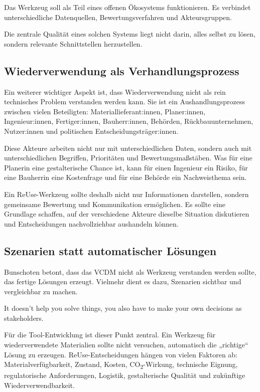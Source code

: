 Das Werkzeug soll als Teil eines offenen Ökosystems funktionieren. Es verbindet unterschiedliche Datenquellen, Bewertungsverfahren und Akteursgruppen.

Die zentrale Qualität eines solchen Systems liegt nicht darin, alles selbst zu lösen, sondern relevante Schnittstellen herzustellen.

\subsection{Wiederverwendung als Verhandlungsprozess}

Ein weiterer wichtiger Aspekt ist, dass Wiederverwendung nicht als rein technisches Problem verstanden werden kann. Sie ist ein Aushandlungsprozess zwischen vielen Beteiligten: Materiallieferant:innen, Planer:innen, Ingenieur:innen, Fertiger:innen, Bauherr:innen, Behörden, Rückbauunternehmen, Nutzer:innen und politischen Entscheidungsträger:innen.

Diese Akteure arbeiten nicht nur mit unterschiedlichen Daten, sondern auch mit unterschiedlichen Begriffen, Prioritäten und Bewertungsmaßstäben. Was für eine Planerin eine gestalterische Chance ist, kann für einen Ingenieur ein Risiko, für eine Bauherrin eine Kostenfrage und für eine Behörde ein Nachweisthema sein.

Ein ReUse-Werkzeug sollte deshalb nicht nur Informationen darstellen, sondern gemeinsame Bewertung und Kommunikation ermöglichen. Es sollte eine Grundlage schaffen, auf der verschiedene Akteure dieselbe Situation diskutieren und Entscheidungen nachvollziehbar aushandeln können.

\subsection{Szenarien statt automatischer Lösungen}

Bunschoten betont, dass das VCDM nicht als Werkzeug verstanden werden sollte, das fertige Lösungen erzeugt. Vielmehr dient es dazu, Szenarien sichtbar und vergleichbar zu machen.

\begin{Blockquote}
It doesn't help you solve things, you also have to make your own decisions as stakeholders.
\end{Blockquote}

Für die Tool-Entwicklung ist dieser Punkt zentral. Ein Werkzeug für wiederverwendete Materialien sollte nicht versuchen, automatisch die „richtige“ Lösung zu erzeugen. ReUse-Entscheidungen hängen von vielen Faktoren ab: Materialverfügbarkeit, Zustand, Kosten, CO\textsubscript{2}-Wirkung, technische Eignung, regulatorische Anforderungen, Logistik, gestalterische Qualität und zukünftige Wiederverwendbarkeit.

